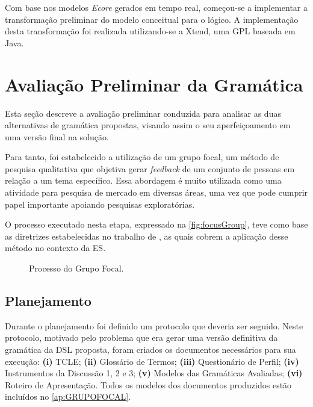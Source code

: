 Com base nos modelos \textit{Ecore} gerados em tempo real, começou-se a implementar a transformação preliminar do modelo conceitual para o lógico. 
A implementação desta transformação foi realizada utilizando-se a Xtend, uma \ac{GPL} baseada em Java.



\section{Avaliação Preliminar da Gramática} \label{sec:AvalPrelGram}
Esta seção descreve a avaliação preliminar conduzida para analisar as duas alternativas de gramática propostas, visando assim o seu aperfeiçoamento em uma versão final na solução. 

Para tanto, foi estabelecido a utilização de um grupo focal, um método de pesquisa qualitativa que objetiva gerar \textit{feedback} de um conjunto de pessoas em relação a um tema específico. 
Essa abordagem é muito utilizada como uma atividade para pesquisa de mercado em diversas áreas, uma vez que pode cumprir papel importante apoiando pesquisas exploratórias.

O processo executado nesta etapa, expressado na \autoref{fig:focusGroup}, teve como base as diretrizes estabelecidas no trabalho de , as quais cobrem a aplicação desse método no contexto da \ac{ES}. 

\begin{figure}[!htb]
    \centering
    \caption{Processo do Grupo Focal.}
    \label{fig:focusGroup}
    
\end{figure}

\subsection{Planejamento}

Durante o planejamento foi definido um protocolo que deveria ser seguido.
Neste protocolo, motivado pelo problema que era gerar uma versão definitiva da gramática da \ac{DSL} proposta, foram criados os documentos necessários para sua execução: \textbf{(i)} \ac{TCLE}; \textbf{(ii)} Glossário de Termos; \textbf{(iii)} Questionário de Perfil; \textbf{(iv)} Instrumentos da Discussão 1, 2 e 3; \textbf{(v)} Modelos das Gramáticas Avaliadas; \textbf{(vi)} Roteiro de Apresentação. 
Todos os modelos dos documentos produzidos estão incluídos no \autoref{ap:GRUPOFOCAL}.

